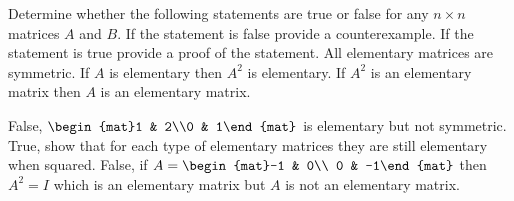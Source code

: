 
\begin{Exercise}[
name={},
title={}, 
difficulty=0,
origin={\cite{BS}}]
Determine whether the following statements are true or false for any $n\times n$
matrices $A$ and $B$.  If the statement is false provide a counterexample. If the
statement is true provide a proof of the statement.
\Question All elementary matrices are symmetric.
\Question If $A$ is elementary then $A^2$ is elementary.
\Question If $A^2$ is an elementary matrix then $A$ is an elementary matrix.
\end{Exercise}
\begin{Answer}
\Question False, $\begin{mat}1 & 2\\0 & 1\end{mat}$ is elementary but not symmetric.
\Question True, show that for each type of elementary matrices they are still elementary when squared.
\Question False, if $A=\begin{mat}-1 & 0\\ 0 & -1\end{mat}$ then $A^2=I$ which is an elementary matrix but $A$ is not an elementary matrix.
\end{Answer}
